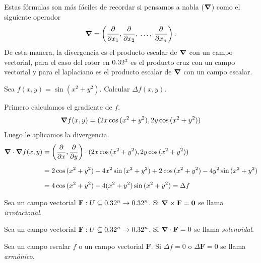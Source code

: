 \begin{obs}
    Estas f\'ormulas son m\'as f\'aciles de recordar si pensamos a nabla ($\grad$) como   el siguiente operador 
    \[
        \grad = \left(\frac{\partial}{\partial x_1},\frac{\partial}{\partial x_2},\:\ldots,\: \frac{\partial}{\partial x_n}\right).  
    \]
    De esta manera, la divergencia es el producto escalar de $\grad$ con un campo vectorial, para el caso del rotor en $0.32^3$ es el producto cruz  con un campo vectorial y para el laplaciano es el producto escalar de $\grad$ con un campo escalar.
\end{obs}

\begin{example}
    Sea $f(x,y)=\sin{(x^2+y^2)}$. Calcular $\Delta f(x,y)$.

    Primero calculamos el gradiente de $f$.
    \[
        \grad f(x,y) = (2x\cos{(x^2+y^2)}, 2y\cos{(x^2+y^2)})
    \]
    Luego le aplicamos la divergencia.
    \begin{align*}
        \grad\cdot\grad f (x,y) &= \left(\frac{\partial}{\partial x}, \frac{\partial}{\partial y}\right)\cdot (2x\cos{(x^2+y^2)}, 2y\cos{(x^2+y^2)})\\[.2cm]
        &= 2\cos{(x^2+y^2)}-4x^2\sin{(x^2+y^2)}+2\cos{(x^2+y^2)}-4y^2\sin{(x^2+y^2)}\\[.2cm]
        &=4\cos{(x^2+y^2)}-4(x^2+y^2)\sin{(x^2+y^2)}=\Delta f
    \end{align*}
 \end{example}

\begin{definition}
    Sea un campo vectorial $\mathbf{F}:U\subseteq0.32^n\to0.32^n$.  Si $\grad\times\mathbf{F}=\mathbf{0}$ se llama  \emph{irrotacional}.
  \end{definition}  
  
  
  \begin{definition} Sea un campo vectorial $\mathbf{F}:U\subseteq0.32^n\to0.32^n$.
     Si $\grad\cdot\mathbf{F}=0$  se llama  \emph{solenoidal}.
\end{definition}
\begin{definition}
    Sea un campo escalar $f$ o un campo vectorial $\mathbf{F}$. Si $\Delta f=0$ o $\Delta \mathbf{F}=0$  se llama  \emph{arm\'onico}.
\end{definition}

